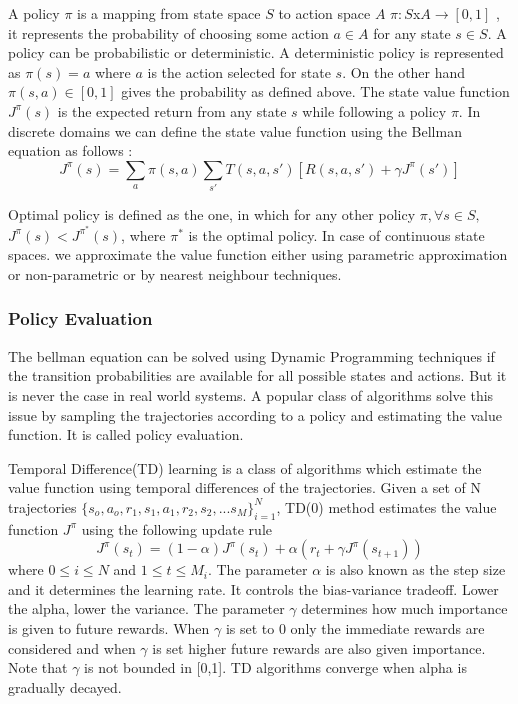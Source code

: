 \documentclass[MTech]{iitmdiss}
\begin{document}
A policy $\pi$ is a mapping from state space $S$ to action space $A$ $\pi:S$x$A \rightarrow [0,1]$ , it represents the probability of choosing some action $a \in A$ for any state $s \in S$. A policy can be probabilistic or deterministic. A deterministic policy is represented as $\pi(s) = a$ where $a$ is the action selected for state $s$. On the other hand $\pi(s,a) \in [0,1]$ gives the probability as defined above. The state value function $J^{\pi}(s)$ is the expected return from any state $s$ while following a policy $\pi$. In discrete domains we can define the state value function using the Bellman equation as follows : 
$$J^{\pi}(s) = \displaystyle \sum_{a}\pi(s,a) \sum_{s'}T(s,a,s')[ R(s,a,s')+ \gamma J^{\pi}(s') ] $$

Optimal policy is defined as the one, in which for any other policy  $ \pi ,\forall s\in S, $ $J^{\pi}(s) < J^{\pi^*}(s)$, where $\pi^*$ is the optimal policy. In case of continuous state spaces. we approximate the value function either using parametric approximation or non-parametric or by nearest neighbour techniques. 

\subsubsection{Policy Evaluation}

The bellman equation can be solved using Dynamic Programming techniques
\cite{rltextbook}
 if the transition probabilities are available for all possible states and actions. But it is never the case in real world systems. A popular class of algorithms solve this issue by sampling the trajectories according to a policy and estimating the value function. It is called policy evaluation. 

Temporal Difference(TD) learning is a class of algorithms which estimate the value function using temporal differences 
\cite{tdlearning}
 of the trajectories. Given a set of N trajectories $\{s_o,a_o,r_1,s_1,a_1,r_2,s_2,... s_M\}_{i=1}^N$, TD(0) method estimates the value function $J^\pi$ using the following update rule 
$$J^{\pi}(s_t) = (1 - \alpha) J^{\pi}(s_t) + \alpha (r_t + \gamma J^{\pi}(s_{t+1})) $$ 
where $0 \leq  i \leq N$ and $1 \leq t \leq M_i$. The parameter $\alpha$ is also known as the step size and it determines the learning rate. It controls the bias-variance tradeoff. Lower the alpha, lower the variance. The parameter $\gamma$ determines how much importance is given to future rewards. When $\gamma $ is set to 0 only the immediate rewards are considered and when $\gamma$ is set higher future rewards are also given importance. Note that $\gamma$ is not bounded in [0,1].  TD algorithms converge when alpha is gradually decayed. 
\end{document}
